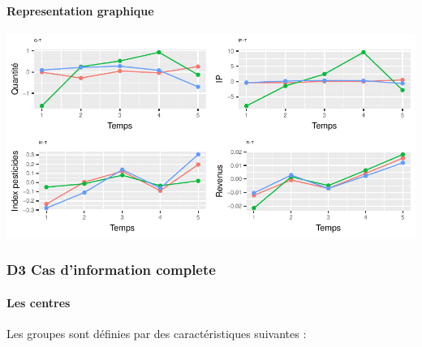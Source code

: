 \documentclass[11pt,]{article}
\let\oldparagraph\paragraph
\renewcommand{\paragraph}[1]{\oldparagraph{#1}\mbox{}}
\begin{document}
\FloatBarrier

\hypertarget{representation-graphique}{%
\paragraph{Representation graphique}\label{representation-graphique}}

\begin{center}\includegraphics{note2pres_files/figure-latex/unnamed-chunk-90-1} \end{center}

\hypertarget{d3-cas-dinformation-complete}{%
\subsubsection{D3 Cas d'information
complete}\label{d3-cas-dinformation-complete}}

\hypertarget{les-centres-1}{%
\paragraph{Les centres}\label{les-centres-1}}

Les groupes sont définies par des caractéristiques suivantes :

\FloatBarrier
\end{document}
